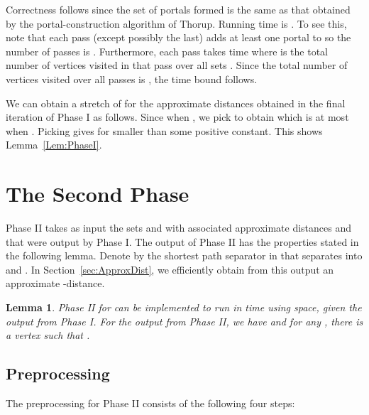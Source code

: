 \documentclass[11pt]{article}
\newtheorem{lemma}{Lemma}
\begin{document}
Correctness follows since the set of portals formed is the same as that obtained by the portal-construction algorithm of Thorup. Running time is . To see this, note that each pass (except possibly the last) adds at least one portal to  so the number of passes is . Furthermore, each pass takes  time where  is the total number of vertices visited in that pass over all sets . Since the total number of vertices visited over all passes is , the time bound follows.

We can obtain a stretch of  for the approximate distances obtained in the final iteration of Phase I as follows. Since  when , we pick  to obtain  which is at most  when . Picking  gives
 for  smaller than some positive constant. This shows Lemma~\ref{Lem:PhaseI}.

\section{The Second Phase}\label{sec:PhaseII}
Phase II takes as input the sets  and  with associated approximate distances  and  that were output by Phase I. The output of Phase II has the properties stated in the following lemma. Denote by  the shortest path separator in  that separates  into  and . In Section~\ref{sec:ApproxDist}, we efficiently obtain from this output an approximate -distance.
\begin{lemma}\label{Lem:PhaseII}
Phase II for  can be implemented to run in  time using  space, given the output from Phase I. For the output  from Phase II, we have  and for any , there is a vertex  such that .
\end{lemma}

\subsection{Preprocessing}
The preprocessing for Phase II consists of the following four steps:
\end{document}
